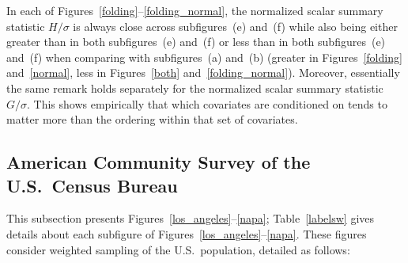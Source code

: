 \documentclass{article}
\begin{document}
In each of Figures~\ref{folding}--\ref{folding_normal},
the normalized scalar summary statistic $H/\sigma$
is always close across subfigures~(e) and~(f)
while also being either greater than in both subfigures~(e) and~(f)
or less than in both subfigures~(e) and~(f) when comparing
with subfigures~(a) and~(b) (greater in Figures~\ref{folding} and~\ref{normal},
less in Figures~\ref{both} and~\ref{folding_normal}).
Moreover, essentially the same remark holds separately
for the normalized scalar summary statistic $G/\sigma$.
This shows empirically that which covariates are conditioned on
tends to matter more than the ordering within that set of covariates.


\subsection{American Community Survey of the U.S.\ Census Bureau}
\label{acs}

This subsection presents Figures~\ref{los_angeles}--\ref{napa};
Table~\ref{labelsw} gives details about each subfigure
of Figures~\ref{los_angeles}--\ref{napa}.
These figures consider weighted sampling of the U.S.\ population,
detailed as follows:
\end{document}
